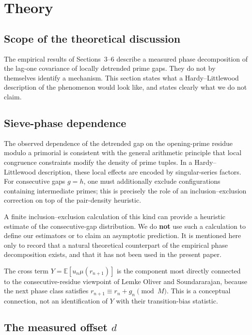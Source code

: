 \section{Theory}
\label{sec:theory}

\subsection{Scope of the theoretical discussion}

The empirical results of Sections~3--6 describe a measured phase decomposition of the lag-one covariance of locally detrended prime gaps. They do not by themselves identify a mechanism. This section states what a Hardy--Littlewood description of the phenomenon would look like, and states clearly what we do not claim.

\subsection{Sieve-phase dependence}

The observed dependence of the detrended gap on the opening-prime residue modulo a primorial is consistent with the general arithmetic principle that local congruence constraints modify the density of prime tuples. In a Hardy--Littlewood description, these local effects are encoded by singular-series factors. For consecutive gaps $g = h$, one must additionally exclude configurations containing intermediate primes; this is precisely the role of an inclusion--exclusion correction on top of the pair-density heuristic.

A finite inclusion--exclusion calculation of this kind can provide a heuristic estimate of the consecutive-gap distribution. We do \textbf{not} use such a calculation to define our estimators or to claim an asymptotic prediction. It is mentioned here only to record that a natural theoretical counterpart of the empirical phase decomposition exists, and that it has not been used in the present paper.

The cross term $Y = \mathbb{E}[u_n \mu(r_{n+1})]$ is the component most directly connected to the consecutive-residue viewpoint of Lemke Oliver and Soundararajan, because the next phase class satisfies $r_{n+1} \equiv r_n + g_n \pmod M$. This is a conceptual connection, not an identification of $Y$ with their transition-bias statistic.

\subsection{The measured offset \texorpdfstring{$d$}{d}}

